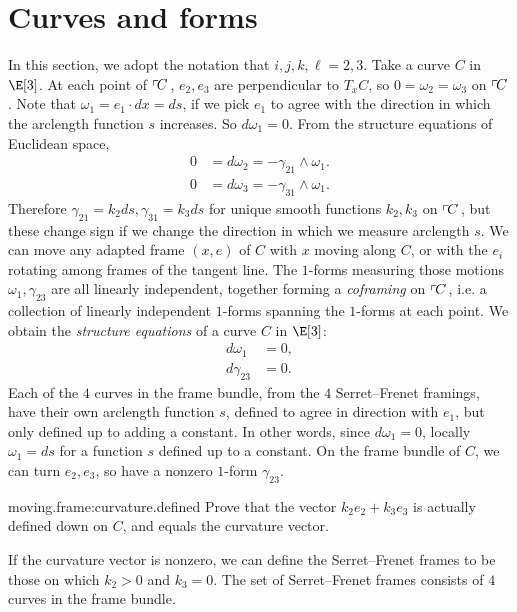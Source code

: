 \section{Curves and forms}
In this section, we adopt the notation that \(i,j,k,\ell=2,3\).
Take a curve \(C\) in \(\E[3]\).
At each point of \(\left\ulcorner\!C\right.\), \(e_2,e_3\) are perpendicular to \(T_x C\), so \(0=\omega_2=\omega_3\) on \(\left\ulcorner\!C\right.\).
Note that \(\omega_1=e_1 \cdot dx=ds\), if we pick \(e_1\) to agree with the direction in which the arclength function \(s\) increases.
So \(d\omega_1=0\).
From the structure equations of Euclidean space,
\begin{align*}
0&=d\omega_2=-\gamma_{2 1} \wedge \omega_1.\\
0&=d\omega_3=-\gamma_{3 1} \wedge \omega_1.
\end{align*}
Therefore \(\gamma_{21}=k_2 ds, \gamma_{31}=k_3 ds\) for unique smooth functions \(k_2,k_3\) on \(\left\ulcorner\!C\right.\), but these change sign if we change the direction in which we measure arclength \(s\).
We can move any adapted frame \((x,e)\) of \(C\) with \(x\) moving along \(C\), or with the \(e_i\) rotating among frames of the tangent line.
The \(1\)-forms measuring those motions \(\omega_1, \gamma_{23}\) are all linearly independent, together forming a \emph{coframing} on \(\left\ulcorner\!C\right.\), i.e. a collection of linearly independent \(1\)-forms spanning the \(1\)-forms at each point.
We obtain the \emph{structure equations} of a curve \(C\) in \(\E[3]\):
\begin{align*}
d
\omega_1 
&=0,
\\
d\gamma_{23} &= 0.
\end{align*}
Each of the \(4\) curves in the frame bundle, from the \(4\) Serret--Frenet framings, have their own arclength function \(s\), defined to agree in direction with \(e_1\), but only defined up to adding a constant.
In other words, since \(d\omega_1=0\), locally \(\omega_1=ds\) for a function \(s\) defined up to a constant.
On the frame bundle of \(C\), we can turn \(e_2,e_3\), so have a nonzero \(1\)-form \(\gamma_{23}\).
\begin{problem}{moving.frame:curvature.defined}
Prove that the vector \(k_2e_2+k_3e_3\) is actually defined down on \(C\), and equals the curvature vector.
\end{problem}
If the curvature vector is nonzero, we can define the Serret--Frenet frames to be those on which \(k_2>0\) and \(k_3=0\).
The set of Serret--Frenet frames consists of \(4\) curves in the frame bundle.
